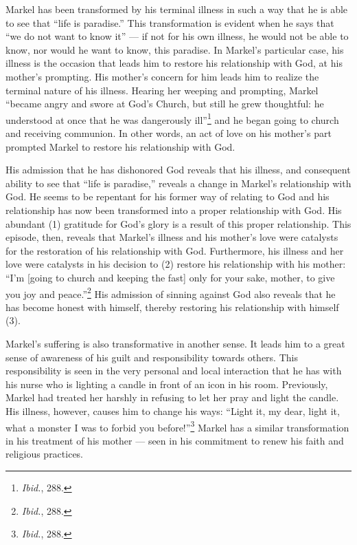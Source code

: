 Markel has been transformed by his terminal illness in such a way that he is able to see that ``life is paradise.'' This transformation is evident when he says that ``we do not want to know it'' --- if not for his own illness, he would not be able to know, nor would he want to know, this paradise. In Markel's particular case, his illness is the occasion that leads him to restore his relationship with God, at his mother's prompting. His mother's concern for him leads him to realize the terminal nature of his illness. Hearing her weeping and prompting, Markel ``became angry and swore at God's Church, but still he grew thoughtful: he understood at once that he was dangerously ill''\footnote{\emph{Ibid.}, 288.} and he began going to church and receiving communion. In other words, an act of love on his mother's part prompted Markel to restore his relationship with God. 

His admission that he has dishonored God reveals that his illness, and consequent ability to see that ``life is paradise,'' reveals a change in Markel's relationship with God. He seems to be repentant for his former way of relating to God and his relationship has now been transformed into a proper relationship with God. His abundant (1) gratitude for God's glory is a result of this proper relationship. This episode, then, reveals that Markel's illness and his mother's love were catalysts for the restoration of his relationship with God. Furthermore, his illness and her love were catalysts in his decision to (2) restore his relationship with his mother: ``I'm [going to church and keeping the fast] only for your sake, mother, to give you joy and peace.''\footnote{\emph{Ibid.}, 288.} His admission of sinning against God also reveals that he has become honest with himself, thereby restoring his relationship with himself (3).

Markel's suffering is also transformative in another sense. It leads him to a great sense of awareness of his guilt and responsibility towards others. This responsibility is seen in the very personal and local interaction that he has with his nurse who is lighting a candle in front of an icon in his room. Previously, Markel had treated her harshly in refusing to let her pray and light the candle. His illness, however, causes him to change his ways: ``Light it, my dear, light it, what a monster I was to forbid you before!\thinspace''\footnote{\emph{Ibid.}, 288.} Markel has a similar transformation in his treatment of his mother --- seen in his commitment to renew his faith and religious practices. 

